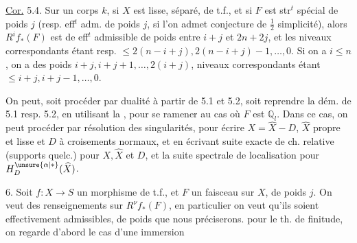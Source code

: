 
\uline{Cor.} 5.4. Sur un corps $k$, si $X$ est lisse, séparé, de t.f., et si $F$ est  str$^{t}$ spécial de poids $j$ (resp. eff$^{t}$ adm. de poids $j$, si l'on admet conjecture de $\frac12$ simplicité), alors $R^if_*(F)$ est de eff$^{t}$ admissible de poids entre $i+j$ et $2n+2j$, et les niveaux correspondants étant resp. $\leq2(n-i+j),2(n-i+j)-1,\ldots,0$. Si on a $i\leq n$, on a  des poids  $i+j,i+j+1,\ldots,2(i+j)$,  niveaux correspondants étant $\leq i+j,i+j-1,\ldots,0$.


On peut, soit procéder par dualité à partir de 5.1 et 5.2, soit reprendre  la dém. de 5.1 resp. 5.2, en utilisant la  , pour se ramener au cas où $F$ est $\mathbb Q_l$. Dans ce cas, on peut procéder par  résolution des singularités, pour écrire $X=\widehat X-D$, $\widehat X$  propre et lisse et $D$  à croisements normaux, et en écrivant suite exacte de ch. relative (supports quelc.) pour $X,\widehat X$ et $D$, et la suite spectrale de localisation pour $H^{\unsure{\alpha|*}}_D(\widehat X)$.


6. Soit $f:X\longrightarrow S$ un morphisme de t.f., et $F$ un faisceau  sur $X$, de poids $j$. On veut des renseignements sur  $R^\nu f_*(F)$, en particulier on veut qu'ils soient effectivement admissibles, de poids que nous préciserons.   pour le th. de finitude, on regarde d'abord le cas d'une immersion
